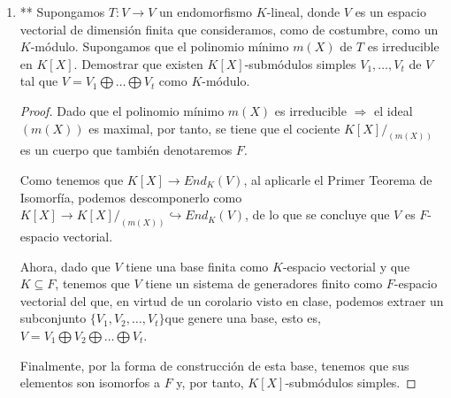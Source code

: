 \documentclass[paper=a4, fontsize=11pt, spanish]{scrartcl}
\begin{document}
\begin{enumerate}
\begin{proof}[Solución]
			Supongamos que existen más submódulos de $\mathbb{P}_n$, entonces tomemos un polinomio $p(x) = x^k
			+ a_{k-1}x^{k-1} + \cdots + a_1x+a_0$ con $k \leq n \Rightarrow p(x) \in \mathbb{P}_n$ y sea $N_p$
			el menor submódulo tal que $p(x) \in N_p$.
			
			Como $N_p$ es un submódulo debe ser cerrado para $T$, luego se tiene
			que $\delta p(x) = kx^{k-1} + (k-1)a_{k-1}x^{k-2} + \cdots + 2a_2x+a_1 \in N_p$ y análogamente se
			deduce que$\delta^2 p(x), \dots, \delta^{k} \in N_p$, es decir, $<\{p, \delta p, \delta^2 p, \dots,
			\delta^k p\}> \subseteq N_p$.
			
			Entonces, es inmediato comprobar que $ <M_k> \cong <\{p, \delta p, \delta^2 p, \dots, \delta^k p\}>$,
			y se tiene que $<M_k> \subseteq N_p$ pero por cómo hemos definido $N_p$ se deduce que $<M_k> = N_p$.
		\end{proof}
		
		\item ** Supongamos $T: V \rightarrow V$ un endomorfismo $K$-lineal, donde $V$ es un espacio vectorial de
		dimensión finita que consideramos, como de costumbre, como un $K$-módulo. Supongamos que el polinomio
		mínimo $m(X)$ de $T$ es irreducible en $K[X]$. Demostrar que existen $K[X]$-submódulos simples $V_1,
		\dots, V_t$ de $V$ tal que $V = V_1 \bigoplus \dots \bigoplus V_t$ como $K$-módulo.
		\begin{proof}
			Dado que el polinomio mínimo $m(X)$ es irreducible $\Rightarrow$ el ideal $(m(X))$ es maximal, por
			tanto, se tiene que el cociente $K[X]/_{(m(X))}$ es un cuerpo que también denotaremos $F$.
			
			Como tenemos que $K[X] \rightarrow End_K(V)$, al aplicarle el Primer Teorema de Isomorfía, podemos
			descomponerlo como $K[X] \rightarrow K[X]/_{(m(X))} \hookrightarrow End_K(V)$, de lo que se concluye
			que $V$ es $F$-espacio vectorial.
			
			Ahora, dado que $V$ tiene una base finita como $K$-espacio vectorial y que $K \subseteq F$, tenemos
			que $V$ tiene un sistema de generadores finito como $F$-espacio vectorial del que, en virtud de un
			corolario visto en clase, podemos extraer un subconjunto $\{V_1, V_2, \dots, V_t\}$que genere una
			base, esto es, $V = V_1 \bigoplus V_2 \bigoplus \dots \bigoplus V_t$.
			
			Finalmente, por la forma de construcción de esta base, tenemos que sus elementos son isomorfos a
			$F$ y, por tanto, $K[X]$-submódulos simples.
		\end{proof}
		

\end{enumerate}
\end{document}
